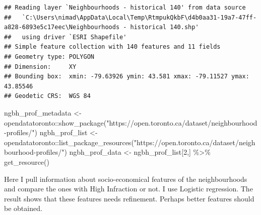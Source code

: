 \documentclass[
]{article}
\newenvironment{Shaded}{\begin{snugshade}}{\end{snugshade}}
\newcommand{\DecValTok}[1]{\textcolor[rgb]{0.00,0.00,0.81}{#1}}
\newcommand{\FunctionTok}[1]{\textcolor[rgb]{0.00,0.00,0.00}{#1}}
\newcommand{\NormalTok}[1]{#1}
\newcommand{\OtherTok}[1]{\textcolor[rgb]{0.56,0.35,0.01}{#1}}
\newcommand{\SpecialCharTok}[1]{\textcolor[rgb]{0.00,0.00,0.00}{#1}}
\newcommand{\StringTok}[1]{\textcolor[rgb]{0.31,0.60,0.02}{#1}}
\begin{document}
\begin{verbatim}
## Reading layer `Neighbourhoods - historical 140' from data source 
##   `C:\Users\nimad\AppData\Local\Temp\RtmpukQkbF\d4b0aa31-19a7-47ff-a828-6893e5c17eec\Neighbourhoods - historical 140.shp' 
##   using driver `ESRI Shapefile'
## Simple feature collection with 140 features and 11 fields
## Geometry type: POLYGON
## Dimension:     XY
## Bounding box:  xmin: -79.63926 ymin: 43.581 xmax: -79.11527 ymax: 43.85546
## Geodetic CRS:  WGS 84
\end{verbatim}

\begin{Shaded}
\begin{Highlighting}[]
\NormalTok{ngbh\_prof\_metadata }\OtherTok{\textless{}{-}}\NormalTok{ opendatatoronto}\SpecialCharTok{::}\FunctionTok{show\_package}\NormalTok{(}\StringTok{"https://open.toronto.ca/dataset/neighbourhood{-}profiles/"}\NormalTok{)}
\NormalTok{ngbh\_prof\_list }\OtherTok{\textless{}{-}}\NormalTok{ opendatatoronto}\SpecialCharTok{::}\FunctionTok{list\_package\_resources}\NormalTok{(}\StringTok{"https://open.toronto.ca/dataset/neighbourhood{-}profiles/"}\NormalTok{)}
\NormalTok{ngbh\_prof\_data }\OtherTok{\textless{}{-}}\NormalTok{ ngbh\_prof\_list[}\DecValTok{2}\NormalTok{,] }\SpecialCharTok{\%\textgreater{}\%} \FunctionTok{get\_resource}\NormalTok{()}
\end{Highlighting}
\end{Shaded}

Here I pull information about socio-economical features of the
neighbourhoods and compare the ones with High Infraction or not. I use
Logistic regression. The result shows that these features needs
refinement. Perhaps better features should be obtained.
\end{document}

